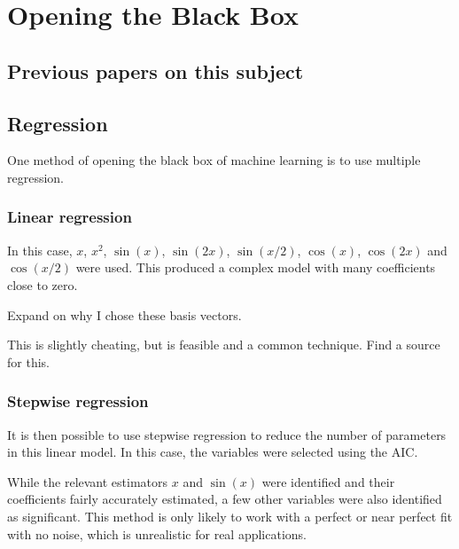 
\chapter{Opening the Black Box}

\section{Previous papers on this subject}

\section{Regression}

One method of opening the black box of machine learning is to use multiple regression.

\subsection{Linear regression}

In this case, \(x\), \(x^2\), \(\sin(x)\), \(\sin(2x)\), \(\sin(x/2)\), \(\cos(x)\), \(\cos(2x)\) and \(\cos(x/2)\) were used.
This produced a complex model with many coefficients close to zero.

\begin{todo}
	Expand on why I chose these basis vectors.
\end{todo}


\begin{todo}
	This is slightly cheating, but is feasible and a common technique. Find a source for this.
\end{todo}

\subsection{Stepwise regression}

It is then possible to use stepwise regression to reduce the number of parameters in this linear model.
In this case, the variables were selected using the \ac{AIC}.


While the relevant estimators \(x\) and \(\sin(x)\) were identified and their coefficients fairly accurately estimated, a few other variables were also identified as significant.
This method is only likely to work with a perfect or near perfect fit with no noise, which is unrealistic for real applications.

